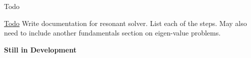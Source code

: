 \begin{DoxyRefDesc}{Todo}
\item[\hyperlink{todo__todo000029}{Todo}]Write documentation for resonant solver. List each of the steps. May also need to include another fundamentals section on eigen-\/value problems.\end{DoxyRefDesc}


{\bfseries Still in Development} 